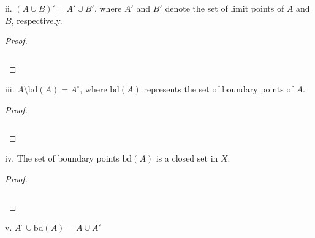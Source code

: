 \pagebreak

ii.  $(A \cup B)' = A' \cup B'$, where $A'$ and $B'$ denote the set of limit points of $A$ and $B$, respectively.\ \\

\begin{proof}\renewcommand{\qedsymbol}{}\ \\\\
    \begin{align*}
    \end{align*}
\end{proof}

\pagebreak

iii. $A \setminus \text{bd}(A) = A^{\circ}$, where $\text{bd}(A)$ represents the set of boundary points of $A$.  \ \\

\begin{proof}\renewcommand{\qedsymbol}{}\ \\\\
    \begin{align*}
    \end{align*}
\end{proof}

\pagebreak

iv. The set of boundary points $\text{bd}(A)$ is a closed set in $X$.  \ \\
    
\begin{proof}\renewcommand{\qedsymbol}{}\ \\\\
    \begin{align*}
    \end{align*}
\end{proof}

\pagebreak


v. $A^{\circ} \cup \text{bd}(A) = A \cup A'$ \ \\
    
